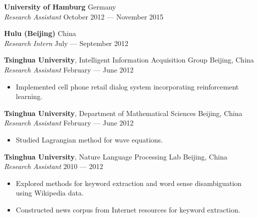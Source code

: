 \documentclass[a4paper,9pt]{extarticle} %
\begin{document}

\textbf{University of Hamburg} \hfill Germany \\
\textit{Research Assistant}  \hfill October 2012 --- November 2015%


\textbf{Hulu (Beijing)} \hfill China \\
\textit{Research Intern} \hfill July --- September 2012%


\iffalse{}

\textbf{Tsinghua University}, Intelligent Information Acquisition Group \hfill Beijing, China \\
\textit{Research Assistant} \hfill February --- June 2012
\vspace{-\parskip}
\begin{itemize}
  \item Implemented cell phone retail dialog system incorporating reinforcement learning.
\end{itemize}


\textbf{Tsinghua University}, Department of Mathematical Sciences \hfill Beijing, China \\
\textit{Research Assistant} \hfill February --- June 2012
\vspace{-\parskip}
\begin{itemize}
  \item Studied Lagrangian method for wave equations.
\end{itemize}


\textbf{Tsinghua University}, Nature Language Processing Lab \hfill Beijing, China \\
\textit{Research Assistant} \hfill 2010 --- 2012
\vspace{-\parskip}
\begin{itemize}
  \item Explored methods for keyword extraction and word sense disambiguation using Wikipedia data.
  \item Constructed news corpus from Internet resources for keyword extraction.
\end{itemize}
\end{document}
